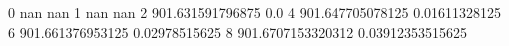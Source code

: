 0 nan nan
1 nan nan
2 901.631591796875 0.0
4 901.647705078125 0.01611328125
6 901.661376953125 0.02978515625
8 901.6707153320312 0.03912353515625
